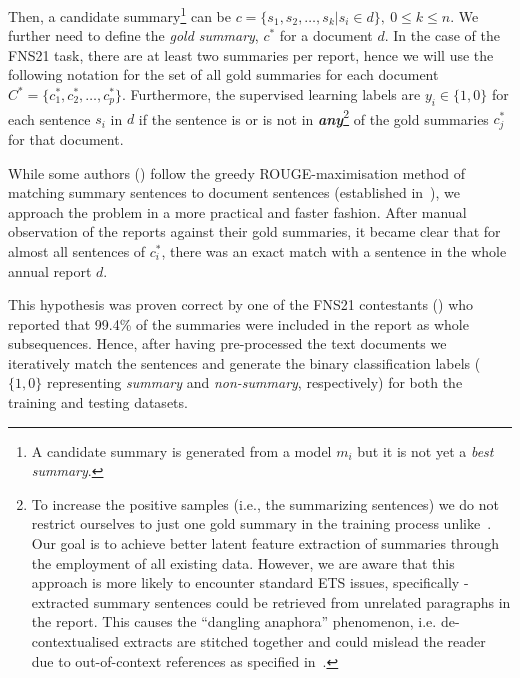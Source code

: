 Then, a candidate summary\footnote{
    A candidate summary is generated from a model $m_{i}$ but it is not yet a \emph{best summary}.
} can be $c=\{s_{1}, s_{2}, \dots, s_{k} | s_{i} \in d \}, \ 0 \leq k \leq n$.
We further need to define the \emph{gold summary}, $c^{*}$ for a document $d$.
In the case of the FNS21 task, there are at least two summaries per report, hence we will use the following notation for the set of all gold summaries for each document $C^{*} = \{c^{*}_{1}, c^{*}_{2}, \dots, c^{*}_{p}\}$.
Furthermore, the supervised learning labels are $y_{i} \in \{1,0\}$ for each sentence $s_{i}$ in $d$ if the sentence is or is not in \textbf{\emph{any}}\footnote{
    To increase the positive samples (i.e., the summarizing sentences) we do not restrict ourselves to just one gold summary in the training process unlike~\cite{orzhenovskii-2021-t5}.
    Our goal is to achieve better latent feature extraction of summaries through the employment of all existing data.
    However, we are aware that this approach is more likely to encounter standard ETS issues, specifically - extracted summary sentences could be retrieved from unrelated paragraphs in the report.
    This causes the \enquote{dangling anaphora} phenomenon, i.e. de-contextualised extracts are stitched together and could mislead the reader due to out-of-context references as specified in~\cite{lin2009summarization}.
} of the gold summaries $c^{*}_{j}$ for that document.

While some authors (\cite{zmandar-etal-2021-joint}) follow the greedy ROUGE-maximisation method of matching summary sentences to document sentences (established in~\cite{nallapati2017summarunner}), we approach the problem in a more practical and faster fashion.
After manual observation of the reports against their gold summaries, it became clear that for almost all sentences of $c^{*}_{i}$, there was an exact match with a sentence in the whole annual report $d$.

This hypothesis was proven correct by one of the FNS21 contestants (\cite{orzhenovskii-2021-t5}) who reported that 99.4\% of the summaries were included in the
report as whole subsequences.
Hence, after having pre-processed the text documents we iteratively match the sentences and generate the binary classification labels ($\{1,0\}$ representing \emph{summary} and \emph{non-summary}, respectively) for both the training and testing datasets.
